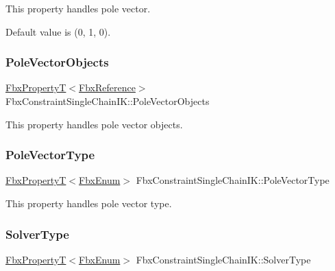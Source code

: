 This property handles pole vector.

Default value is (0, 1, 0). \mbox{\label{class_fbx_constraint_single_chain_i_k_a20b0f346f5d104fd63a69e3b560cfaba}} 
\subsubsection{\texorpdfstring{Pole\+Vector\+Objects}{PoleVectorObjects}}
{\footnotesize\ttfamily \hyperlink{class_fbx_property_t}{Fbx\+PropertyT}$<$\hyperlink{fbxtypes_8h_a44df6a2eec915cf27cd481e5c5e48a24}{Fbx\+Reference}$>$ Fbx\+Constraint\+Single\+Chain\+I\+K\+::\+Pole\+Vector\+Objects}

This property handles pole vector objects. \mbox{\label{class_fbx_constraint_single_chain_i_k_a5005bf5aa9d33200a228ad9723c519b0}} 
\subsubsection{\texorpdfstring{Pole\+Vector\+Type}{PoleVectorType}}
{\footnotesize\ttfamily \hyperlink{class_fbx_property_t}{Fbx\+PropertyT}$<$\hyperlink{fbxtypes_8h_a9a28614cb4272a0ad7d748eda7f3d3e5}{Fbx\+Enum}$>$ Fbx\+Constraint\+Single\+Chain\+I\+K\+::\+Pole\+Vector\+Type}

This property handles pole vector type. \mbox{\label{class_fbx_constraint_single_chain_i_k_a2ed14960ba042a0c7f447306560bbe11}} 
\subsubsection{\texorpdfstring{Solver\+Type}{SolverType}}
{\footnotesize\ttfamily \hyperlink{class_fbx_property_t}{Fbx\+PropertyT}$<$\hyperlink{fbxtypes_8h_a9a28614cb4272a0ad7d748eda7f3d3e5}{Fbx\+Enum}$>$ Fbx\+Constraint\+Single\+Chain\+I\+K\+::\+Solver\+Type}

